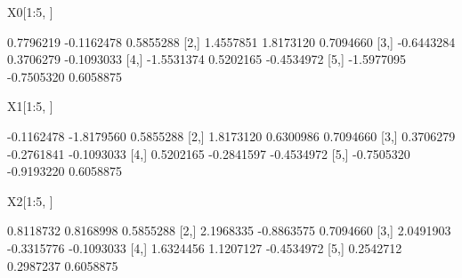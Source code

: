 \begin{Schunk}
\begin{Sinput}
  X0[1:5, ]
\end{Sinput}
\begin{Soutput}
           [,1]       [,2]       [,3]
[1,]  0.7796219 -0.1162478  0.5855288
[2,]  1.4557851  1.8173120  0.7094660
[3,] -0.6443284  0.3706279 -0.1093033
[4,] -1.5531374  0.5202165 -0.4534972
[5,] -1.5977095 -0.7505320  0.6058875
\end{Soutput}
\begin{Sinput}
  X1[1:5, ]
\end{Sinput}
\begin{Soutput}
           [,1]       [,2]       [,3]
[1,] -0.1162478 -1.8179560  0.5855288
[2,]  1.8173120  0.6300986  0.7094660
[3,]  0.3706279 -0.2761841 -0.1093033
[4,]  0.5202165 -0.2841597 -0.4534972
[5,] -0.7505320 -0.9193220  0.6058875
\end{Soutput}
\begin{Sinput}
  X2[1:5, ]
\end{Sinput}
\begin{Soutput}
          [,1]       [,2]       [,3]
[1,] 0.8118732  0.8168998  0.5855288
[2,] 2.1968335 -0.8863575  0.7094660
[3,] 2.0491903 -0.3315776 -0.1093033
[4,] 1.6324456  1.1207127 -0.4534972
[5,] 0.2542712  0.2987237  0.6058875
\end{Soutput}
\end{Schunk}
